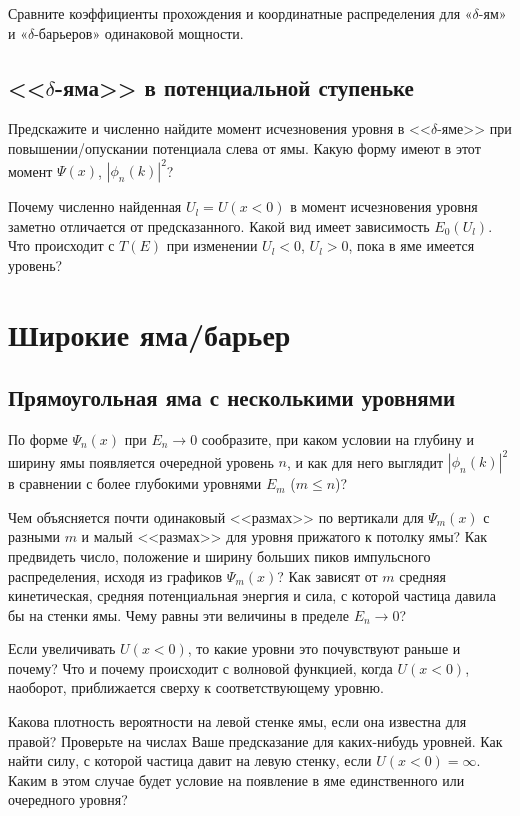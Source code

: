 \documentclass[12pt]{article}
\begin{document}
Сравните коэффициенты
прохождения и координатные распределения для «$\delta$-ям»  и
«$\delta$-барьеров» одинаковой мощности.

\hypertarget{delta-well in step}{}\subsection[Дельта-яма в
потенциальной ступеньке]{<<$\delta$-яма>> в
потенциальной ступеньке}
Предскажите и численно найдите момент исчезновения уровня в
<<$\delta$-яме>> при повышении/опускании потенциала слева от ямы.
Какую форму имеют в этот момент $\Psi (x)$, $|\phi_n(k)|^2$?

Почему численно найденная $U_l=U(x<0)$ в момент исчезновения
уровня заметно отличается от предсказанного. Какой вид имеет
зависимость $E_0(U_l)$. Что происходит с $T(E)$ при изменении
$U_l<0$, $U_l>0$, пока в яме имеется уровень?

\hypertarget{delta-well}{}\section{Широкие яма/барьер}
\hypertarget{well}{}\subsection{Прямоугольная яма с несколькими
уровнями}
По форме $\Psi_n (x)$ при $E_n\rightarrow 0$ сообразите, при
каком условии на глубину и ширину ямы появляется очередной
уровень $n$, и как для него выглядит $|\phi_n(k)|^2$ в сравнении
с более глубокими уровнями $E_m$ ($m\le n$)?

Чем объясняется
почти одинаковый <<размах>> по вертикали для $\Psi_m (x)$ с разными
$m$ и малый <<размах>> для уровня прижатого к потолку ямы?  Как
предвидеть число, положение и ширину больших пиков импульсного
распределения, исходя из графиков $\Psi_m (x)$? Как зависят от
$m$ средняя кинетическая, средняя потенциальная энергия и сила, с
которой частица давила бы на стенки ямы. Чему равны эти величины
в пределе $E_n\rightarrow 0$?

Если увеличивать $U(x<0)$, то какие уровни это почувствуют
раньше и почему? Что и почему происходит с волновой функцией,
когда $U(x<0)$, наоборот, приближается сверху к соответствующему
уровню.

Какова плотность вероятности на левой стенке
ямы, если она известна для правой?
Проверьте на числах Ваше
предсказание для каких-нибудь уровней. Как найти силу, с
которой частица давит на левую стенку, если $U(x<0)=\infty$.
Каким в этом случае будет условие на появление в яме
единственного или очередного уровня?
\end{document}
